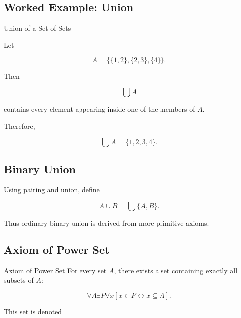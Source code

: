 \subsection{Worked Example: Union}
\label{subsec:worked-axiomatic-union}

\begin{workedexamplebox}{Union of a Set of Sets}

Let

\[
A
=
\{
\{1,2\},
\{2,3\},
\{4\}
\}.
\]

Then

\[
\bigcup A
\]

contains every element appearing inside one of the members of \(A\).

Therefore,

\begin{answerbox}
\[
\boxed{
\bigcup A
=
\{1,2,3,4\}.
}
\]
\end{answerbox}

\end{workedexamplebox}

\subsection{Binary Union}
\label{subsec:binary-union-set-theory}

Using pairing and union, define

\[
\boxed{
A\cup B
=
\bigcup
\{A,B\}.
}
\]

Thus ordinary binary union is derived from more primitive axioms.

\subsection{Axiom of Power Set}
\label{subsec:axiom-power-set}

\begin{definitionbox}{Axiom of Power Set}
For every set \(A\), there exists a set containing exactly all subsets of
\(A\):

\[
\boxed{
\forall A
\exists P
\forall x
\left[
x\in P
\leftrightarrow
x\subseteq A
\right].
}
\]
\end{definitionbox}

This set is denoted

